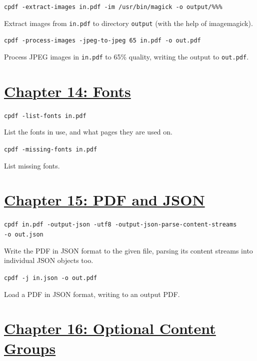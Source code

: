 \documentclass{book}
\begin{document}
\begin{framed}\noindent\texttt{cpdf -extract-images in.pdf -im /usr/bin/magick -o output/\%\%\%}\end{framed}

\noindent Extract images from \texttt{in.pdf} to directory \texttt{output} (with the help of imagemagick).

\begin{framed}\noindent\texttt{cpdf -process-images -jpeg-to-jpeg 65 in.pdf -o out.pdf}\end{framed}

\noindent Process JPEG images in \texttt{in.pdf} to 65\% quality, writing the output to \texttt{out.pdf}.

\section*{\hyperref[chap:14]{Chapter 14: Fonts}}

\begin{framed}\noindent\texttt{cpdf -list-fonts in.pdf}\end{framed}

\noindent List the fonts in use, and what pages they are used on.

\begin{framed}\noindent\texttt{cpdf -missing-fonts in.pdf}\end{framed}

\noindent List missing fonts.

\section*{\hyperref[chap:15]{Chapter 15: PDF and JSON}}

\begin{framed}\noindent\texttt{cpdf in.pdf -output-json -utf8 -output-json-parse-content-streams\\\phantom{\ \ \ \ } -o out.json}\end{framed}

\noindent Write the PDF in JSON format to the given file, parsing its content streams into individual JSON objects too.

\begin{framed}\noindent\texttt{cpdf -j in.json -o out.pdf}\end{framed}

\noindent Load a PDF in JSON format, writing to an output PDF.

\section*{\hyperref[chap:16]{Chapter 16: Optional Content Groups}}
\end{document}
